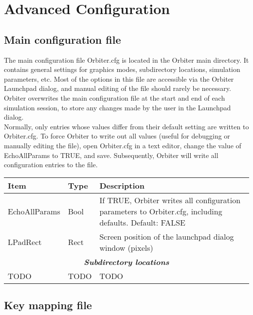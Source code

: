 \documentclass[Orbiter Developer Manual.tex]{subfiles}
\begin{document}
\section{Advanced Configuration}

\subsection{Main configuration file}
The main configuration file Orbiter.cfg is located in the Orbiter main directory. It contains general settings for graphics modes, subdirectory locations, simulation parameters, etc. Most of the options in this file are accessible via the Orbiter Launchpad dialog, and manual editing of the file should rarely be necessary.\\
Orbiter overwrites the main configuration file at the start and end of each simulation session, to store any changes made by the user in the Launchpad dialog.\\
Normally, only entries whose values differ from their default setting are written to Orbiter.cfg. To force Orbiter to write out all values (useful for debugging or manually editing the file), open Orbiter.cfg in a text editor, change the value of EchoAllParams to TRUE, and save. Subsequently, Orbiter will write all configuration entries to the file.

	\begin{longtable}{ |p{}|p{}|p{}| }
	\hline\rule{0pt}{2ex}
	\textbf{Item} & \textbf{Type} & \textbf{Description}\\
	\hline\rule{0pt}{2ex}
	EchoAllParams & Bool & If TRUE, Orbiter writes all configuration parameters to Orbiter.cfg, including defaults. Default: FALSE\\
	\hline\rule{0pt}{2ex}
	LPadRect & Rect & Screen position of the launchpad dialog window (pixels)\\
	\hline
	\multicolumn{3}{|c|}{\rule{0pt}{2ex}\textbf{\textit{Subdirectory locations}}}\\
	\hline\rule{0pt}{2ex}
	TODO & TODO & TODO\\
	\hline
	\end{longtable}


\subsection{Key mapping file}
\end{document}
